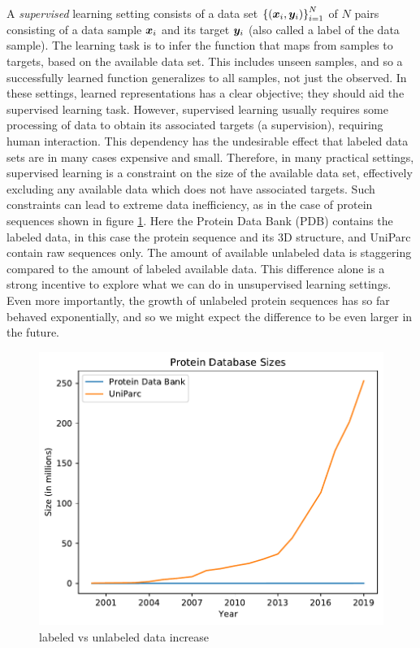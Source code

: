 A \textit{supervised} learning setting consists of a data set ${\mathopen{} \left\{ {\mathopen{} \left( \bm{ x }_i, \bm{ y }_i \right) \mathclose{}} \right\} \mathclose{}}^N_{i=1}$ of $N$ pairs consisting of a data sample $\bm{ x }_i$ and its target $\bm{ y }_i$ (also called a label of the data sample). The learning task is to infer the function that maps from samples to targets, based on the available data set. This includes unseen samples, and so a successfully learned function generalizes to all samples, not just the observed. In these settings, learned representations has a clear objective; they should aid the supervised learning task. However, supervised learning usually requires some processing of data to obtain its associated targets (a supervision), requiring human interaction. This dependency has the undesirable effect that labeled data sets are in many cases expensive and small. Therefore, in many practical settings, supervised learning is a constraint on the size of the available data set, effectively excluding any available data which does not have associated targets. Such constraints can lead to extreme data inefficiency, as in the case of protein sequences shown in figure \ref{fig:data_increase}. Here the Protein Data Bank (PDB) contains the labeled data, in this case the protein sequence and its 3D structure, and UniParc contain raw sequences only. The amount of available unlabeled data is staggering compared to the amount of labeled available data. This difference alone is a strong incentive to explore what we can do in unsupervised learning settings. Even more importantly, the growth of unlabeled protein sequences has so far behaved exponentially, and so we might expect the difference to be even larger in the future.

\begin{figure}[ht]
    \centering
    \includegraphics{report/figures/protein_size.pdf}
    \caption{labeled vs unlabeled data increase }
    \label{fig:data_increase}
\end{figure}

